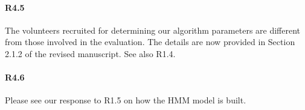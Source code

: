 \paragraph{R4.5} The volunteers recruited for determining our algorithm parameters are different from those involved in the
 evaluation. The details are now provided in Section 2.1.2 of the revised manuscript. See also R1.4.

 \paragraph{R4.6} Please see our response to R1.5 on how the HMM model is built.

